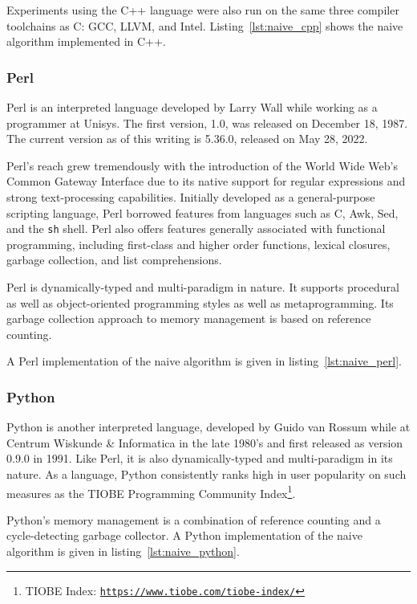Experiments using the C++ language were also run on the same three compiler toolchains as C: GCC, LLVM, and Intel. Listing~\ref{lst:naive_cpp} shows the naive algorithm implemented in C++.



\subsubsection{Perl}

Perl is an interpreted language developed by Larry Wall while working as a programmer at Unisys. The first version, 1.0, was released on December 18, 1987. The current version as of this writing is 5.36.0, released on May 28, 2022.

Perl's reach grew tremendously with the introduction of the World Wide Web's Common Gateway Interface due to its native support for regular expressions and strong text-processing capabilities. Initially developed as a general-purpose scripting language, Perl borrowed features from languages such as C, Awk, Sed, and the \texttt{sh} shell. Perl also offers features generally associated with functional programming, including first-class and higher order functions, lexical closures, garbage collection, and list comprehensions.

Perl is dynamically-typed and multi-paradigm in nature. It supports procedural as well as object-oriented programming styles as well as metaprogramming. Its garbage collection approach to memory management is based on reference counting.

A Perl implementation of the naive algorithm is given in listing~\ref{lst:naive_perl}.



\subsubsection{Python}

Python is another interpreted language, developed by Guido van Rossum while at Centrum Wiskunde \& Informatica in the late 1980's and first released as version 0.9.0 in 1991. Like Perl, it is also dynamically-typed and multi-paradigm in its nature. As a language, Python consistently ranks high in user popularity on such measures as the TIOBE Programming Community Index\footnote{TIOBE Index: \texttt{\url{https://www.tiobe.com/tiobe-index/}}}.

Python's memory management is a combination of reference counting and a cycle-detecting garbage collector. A Python implementation of the naive algorithm is given in listing~\ref{lst:naive_python}.

